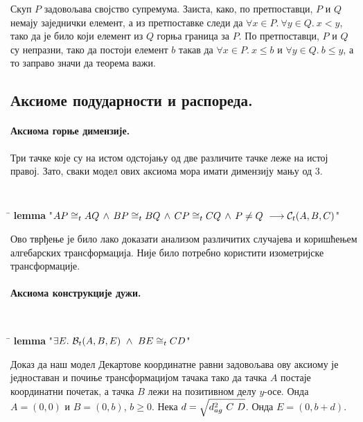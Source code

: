 Скуп $P$ задовољава својство супремума. Заиста, како, по претпоставци,
$P$ и $Q$ немају заједнички елемент, а из претпоставке следи да
$\forall x \in P.\ \forall y \in Q.\ x < y$, тако да је било који
елемент из $Q$ горња граница за $P$. По претпоставци, $P$ и $Q$ су
непразни, тако да постоји елемент $b$ такав да $\forall x \in P.\ x
\leq b$ и $\forall y \in Q.\ b \leq y$, а то заправо значи да теорема
важи.

\subsection{Аксиоме подударности и распореда.}
\paragraph{Аксиома горње димензије.}
Три тачке које су на истом одстојању од две различите тачке леже на
истој правој. Зато, сваки модел ових аксиома мора имати димензију мању
од 3.
{\tt
\begin{tabbing}
\hspace{5mm}\=\kill
\textbf{lemma} "$AP \cong_t AQ \,\wedge\, BP \cong_t BQ \,\wedge\, CP \cong_t CQ \,\wedge\,  P \neq Q \ \longrightarrow \mathcal{C}_t(A, B, C)$"
\end{tabbing}
}
\begin{center}

\end{center}

Ово тврђење је било лако доказати анализом различитих случајева и
коришћењем алгебарских трансформација. Није било потребно користити
изометријске трансформације.

\paragraph{Аксиома конструкције дужи.}
{\tt
\begin{tabbing}
\hspace{5mm}\=\kill
\textbf{lemma} "$\exists E.\ \bett{A}{B}{E}\ \wedge\ \congrt{B}{E}{C}{D}$"
\end{tabbing}
}  
Доказ да наш модел Декартове координатне равни задовољава ову аксиому
је једноставан и почиње трансформацијом тачака тако да тачка $A$
постаје координатни почетак, а тачка $B$ лежи на позитивном делу
$y$-осе. Онда $A = (0, 0)$ и $B = (0, b)$, $b \ge 0$. Нека $d =
\sqrt{d^2_{ag}\ C\ D}$. Онда $E = (0, b + d)$.

